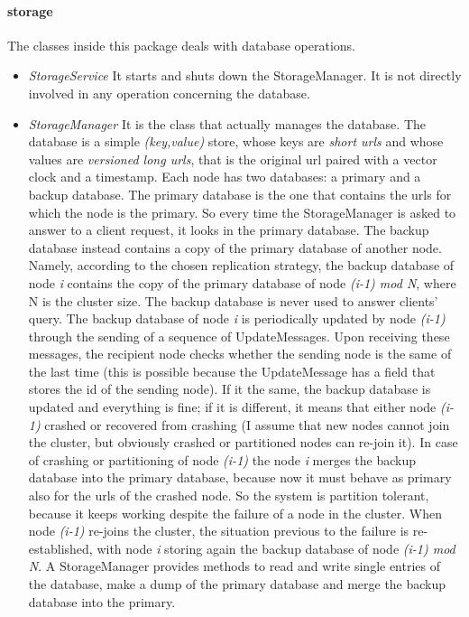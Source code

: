 \documentclass{article}
\begin{document}
\paragraph{storage} The classes inside this package deals with database operations.
\begin{itemize}
\item \textit{StorageService} It starts and shuts down the StorageManager. It is not directly involved in any operation concerning the database.
\item \textit{StorageManager} It is the class that actually manages the database. The database is a simple \textit{(key,value)} store, whose keys are \textit{short urls} and whose values are \textit{versioned long urls}, that is the original url paired with a vector clock and a timestamp. Each node has two databases: a primary and a backup database. The primary database is the one that contains the urls for which the node is the primary. So every time the StorageManager is asked to answer to a client request, it looks in the primary database. The backup database instead contains a copy of the primary database of another node. Namely, according to the chosen replication strategy, the backup database of node \textit{i} contains the copy of the primary database of node \textit{(i-1) mod N}, where N is the cluster size. The backup database is never used to answer clients' query. The backup database of node \textit{i} is periodically updated by node \textit{(i-1)} through the sending of a sequence of UpdateMessages. Upon receiving these messages, the recipient node checks whether the sending node is the same of the last time (this is possible because the UpdateMessage has a field that stores the id of the sending node). If it the same, the backup database is updated and everything is fine; if it is different, it means that either node \textit{(i-1)} crashed or recovered from crashing (I assume that new nodes cannot join the cluster, but obviously crashed or partitioned nodes can re-join it). In case of crashing or partitioning of node \textit{(i-1)} the node \textit{i} merges the backup database into the primary database, because now it must behave as primary also for the urls of the crashed node. So the system is partition tolerant, because it keeps working despite the failure of a node in the cluster. When node \textit{(i-1)} re-joins the cluster, the situation previous to the failure is re-established, with node \textit{i} storing again the backup database of node \textit{(i-1) mod N}. A StorageManager provides methods to read and write single entries of the database, make a dump of the primary database and merge the backup database into the primary. 
\end{itemize}
\end{document}
